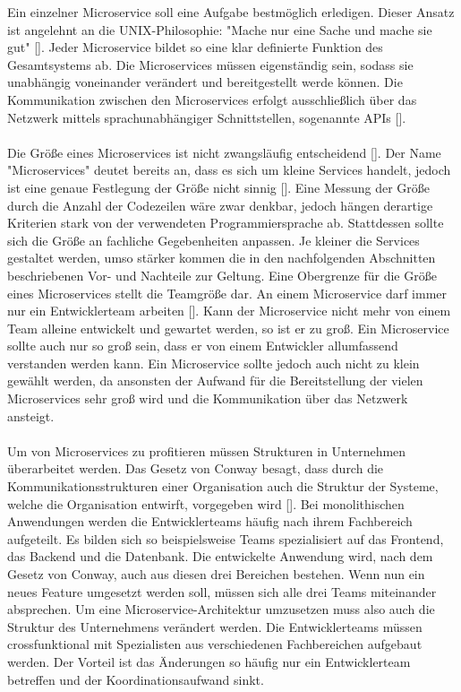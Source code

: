 Ein einzelner Microservice soll eine Aufgabe bestmöglich erledigen. Dieser Ansatz ist angelehnt an die \acs{UNIX}-Philosophie: "Mache nur eine Sache und mache sie gut" [\cite[]{salusQuarter1994}]. Jeder Microservice bildet so eine klar definierte Funktion des Gesamtsystems ab. Die Microservices müssen eigenständig sein, sodass sie unabhängig voneinander verändert und bereitgestellt werde können. Die Kommunikation zwischen den Microservices erfolgt ausschließlich über das Netzwerk mittels sprachunabhängiger Schnittstellen, sogenannte \acp{API} [\cite[S. 64]{trempArchitekturen2021}]. \\
\\
Die Größe eines Microservices ist nicht zwangsläufig entscheidend [\cite[S. 2]{wolffMicroservices2018}]. Der Name "Microservices" deutet bereits an, dass es sich um kleine Services handelt, jedoch ist eine genaue Festlegung der Größe nicht sinnig [\cite[S. 22]{newmanMicroservices2015}]. Eine Messung der Größe durch die Anzahl der Codezeilen wäre zwar denkbar, jedoch hängen derartige Kriterien stark von der verwendeten Programmiersprache ab. Stattdessen sollte sich die Größe an fachliche Gegebenheiten anpassen. Je kleiner die Services gestaltet werden, umso stärker kommen die in den nachfolgenden Abschnitten beschriebenen Vor- und Nachteile zur Geltung. Eine Obergrenze für die Größe eines Microservices stellt die Teamgröße dar. An einem Microservice darf immer nur ein Entwicklerteam arbeiten [\cite[S. 23]{newmanMicroservices2015}]. Kann der Microservice nicht mehr von einem Team alleine entwickelt und gewartet werden, so ist er zu groß. Ein Microservice sollte auch nur so groß sein, dass er von einem Entwickler allumfassend verstanden werden kann. Ein Microservice sollte jedoch auch nicht zu klein gewählt werden, da ansonsten der Aufwand für die Bereitstellung der vielen Microservices sehr groß wird und die Kommunikation über das Netzwerk ansteigt. \\
\\
Um von Microservices zu profitieren müssen Strukturen in Unternehmen überarbeitet werden. Das Gesetz von Conway besagt, dass durch die Kommunikationsstrukturen einer Organisation auch die Struktur der Systeme, welche die Organisation entwirft, vorgegeben wird [\cite{conwayHow1968}]. Bei monolithischen Anwendungen werden die Entwicklerteams häufig nach ihrem Fachbereich aufgeteilt. Es bilden sich so beispielsweise Teams spezialisiert auf das Frontend, das Backend und die Datenbank. Die entwickelte Anwendung wird, nach dem Gesetz von Conway, auch aus diesen drei Bereichen bestehen. Wenn nun ein neues Feature umgesetzt werden soll, müssen sich alle drei Teams miteinander absprechen. Um eine Microservice-Architektur umzusetzen muss also auch die Struktur des Unternehmens verändert werden. Die Entwicklerteams müssen crossfunktional mit Spezialisten aus verschiedenen Fachbereichen aufgebaut werden. Der Vorteil ist das Änderungen so häufig nur ein Entwicklerteam betreffen und der Koordinationsaufwand sinkt. \\
